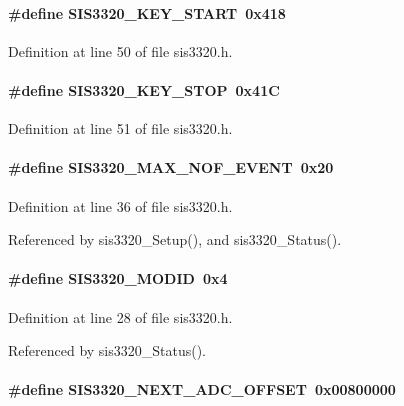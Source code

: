 \paragraph[{SIS3320\_\-KEY\_\-START}]{\setlength{\rightskip}{0pt plus 5cm}\#define SIS3320\_\-KEY\_\-START~0x418}\hfill\label{sis3320_8h_ae8feed4c9eec767265d6f8c4b060d051}


Definition at line 50 of file sis3320.h.
\paragraph[{SIS3320\_\-KEY\_\-STOP}]{\setlength{\rightskip}{0pt plus 5cm}\#define SIS3320\_\-KEY\_\-STOP~0x41C}\hfill\label{sis3320_8h_a0e1ff10a513c768061f1813d8650f63b}


Definition at line 51 of file sis3320.h.
\paragraph[{SIS3320\_\-MAX\_\-NOF\_\-EVENT}]{\setlength{\rightskip}{0pt plus 5cm}\#define SIS3320\_\-MAX\_\-NOF\_\-EVENT~0x20}\hfill\label{sis3320_8h_a1fbc8a9a0315f94ec2d43669f39854b1}


Definition at line 36 of file sis3320.h.

Referenced by sis3320\_\-Setup(), and sis3320\_\-Status().
\paragraph[{SIS3320\_\-MODID}]{\setlength{\rightskip}{0pt plus 5cm}\#define SIS3320\_\-MODID~0x4}\hfill\label{sis3320_8h_a1d074c7d5493645430c4e6057416ab56}


Definition at line 28 of file sis3320.h.

Referenced by sis3320\_\-Status().
\paragraph[{SIS3320\_\-NEXT\_\-ADC\_\-OFFSET}]{\setlength{\rightskip}{0pt plus 5cm}\#define SIS3320\_\-NEXT\_\-ADC\_\-OFFSET~0x00800000}\hfill\label{sis3320_8h_a5308dbdfbe08f2b9b98093a9d374d05f}


